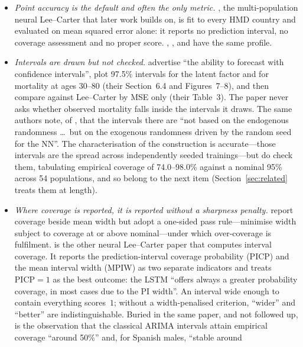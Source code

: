 \begin{itemize}
\item \emph{Point accuracy is the default and often the only metric.}
  \citet{richman2021neural}, the multi-population neural Lee--Carter that
  later work builds on, is fit to every HMD country and evaluated on mean
  squared error alone: it reports no prediction interval, no coverage
  assessment and no proper score.
  \citet{scognamiglio2022calibrating}, \citet{nigri2019deep},
  \citet{petnehazi2019mortality} and \citet{perla2021time} have the same
  profile.
\item \emph{Intervals are drawn but not checked.} \citet{miyata2022extending}
  advertise ``the ability to forecast with confidence intervals'', plot
  97.5\% intervals for the latent factor and for mortality at ages 30--80
  (their Section~6.4 and Figures~7--8), and then compare against Lee--Carter
  by MSE only (their Table~3). The paper never asks whether observed
  mortality falls inside the intervals it draws. The same authors note, of
  \citet{schnurch2022point}, that the intervals there are ``not based on the
  endogenous randomness \ldots\ but on the exogenous randomness driven by the
  random seed for the NN''. The characterisation of the construction is
  accurate---those intervals are the spread across independently seeded
  trainings---but \citet{schnurch2022point} do check them, tabulating
  empirical coverage of 74.0--98.0\% against a nominal 95\% across 54
  populations, and so belong to the next item
  (Section~\ref{sec:related} treats them at length).
\item \emph{Where coverage is reported, it is reported without a sharpness
  penalty.} \citet{schnurch2022point} report coverage beside mean width but
  adopt a one-sided pass rule---minimise width subject to coverage at or
  above nominal---under which over-coverage is fulfilment.
  \citet{marino2023neural} is the other neural Lee--Carter paper that
  computes interval coverage. It reports the
  prediction-interval coverage probability (PICP) and the mean interval width
  (MPIW) as two separate indicators and treats $\mathrm{PICP}=1$ as the best
  outcome: the LSTM ``offers always a greater probability coverage, in most
  cases due to the PI width''. An interval wide enough to contain everything
  scores~$1$; without a width-penalised criterion, ``wider'' and ``better''
  are indistinguishable. Buried in the same paper, and not followed up, is
  the observation that the classical ARIMA intervals attain empirical
  coverage ``around 50\%'' and, for Spanish males, ``stable around

\end{itemize}
